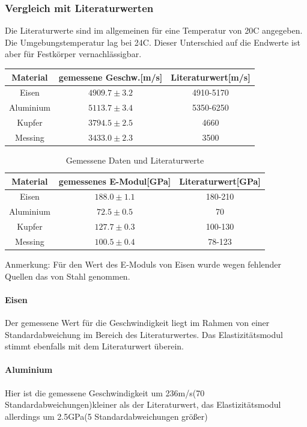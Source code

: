 \documentclass[12pt,a4paper]{article}
\begin{document}
\subsubsection{Vergleich mit Literaturwerten}
Die Literaturwerte sind im allgemeinen für eine Temperatur von 20C angegeben. Die Umgebungstemperatur lag bei 24C. Dieser Unterschied auf die Endwerte ist aber für Festkörper vernachlässigbar.
\begin{table}
\begin{tabular}{|c|c|c|}
\hline 
Material & gemessene Geschw.[m/s] & Literaturwert[m/s] \\ 
\hline 
Eisen & $4909.7\pm3.2$ & 4910-5170  \\ 
\hline 
Aluminium & $5113.7\pm3.4$ & 5350-6250  \\ 
\hline 
Kupfer & $3794.5\pm2.5$ & 4660 \\ 
\hline 
Messing & $3433.0\pm2.3$ & 3500 \\ 
\hline 
\end{tabular} 
\end{table}
\begin{table}
\begin{tabular}{|c|c|c|}
\hline 
Material & gemessenes E-Modul[GPa] & Literaturwert[GPa] \\ 
\hline 
Eisen & $188.0\pm1.1$ & 180-210 \\ 
\hline 
Aluminium & $72.5\pm0.5$ & 70 \\ 
\hline 
Kupfer & $127.7\pm0.3$ & 100-130 \\ 
\hline 
Messing & $100.5\pm0.4$ & 78-123 \\ 
\hline 
\end{tabular} 
\caption{Gemessene Daten und Literaturwerte}
Anmerkung: Für den Wert des E-Moduls von Eisen wurde wegen fehlender Quellen das von Stahl genommen.
\end{table}
\paragraph{Eisen}
Der gemessene Wert für die Geschwindigkeit liegt im Rahmen von einer Standardabweichung im Bereich des Literaturwertes.
Das Elastizitätsmodul stimmt ebenfalls mit dem Literaturwert überein.
\paragraph{Aluminium}
Hier ist die gemessene Geschwindigkeit um 236m/s(70 Standardabweichungen)kleiner als der Literaturwert, das Elastizitätsmodul allerdings um 2.5GPa(5 Standardabweichungen größer)
\end{document}
